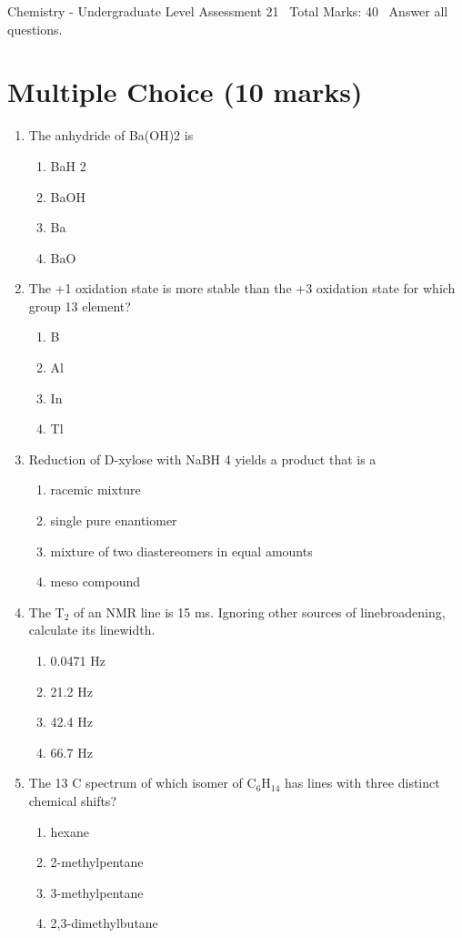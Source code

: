 \documentclass[12pt]{article}
\begin{document}
\begin{center}
Chemistry - Undergraduate Level Assessment 21 \
Total Marks: 40 \
Answer all questions.
\end{center}

\section*{Multiple Choice (10 marks)}
\begin{enumerate}[label=\arabic*.]
\item The anhydride of Ba(OH)2 is
\begin{enumerate}[label=(\alph*)]
    \item BaH 2
    \item BaOH
    \item Ba
    \item BaO
\end{enumerate}
\item The +1 oxidation state is more stable than the +3 oxidation state for which group 13 element?
\begin{enumerate}[label=(\alph*)]
    \item B
    \item Al
    \item In
    \item Tl
\end{enumerate}
\item Reduction of D-xylose with NaBH 4 yields a product that is a
\begin{enumerate}[label=(\alph*)]
    \item racemic mixture
    \item single pure enantiomer
    \item mixture of two diastereomers in equal amounts
    \item meso compound
\end{enumerate}
\item The T$_{2}$ of an NMR line is 15 ms. Ignoring other sources of linebroadening, calculate its linewidth.
\begin{enumerate}[label=(\alph*)]
    \item 0.0471 Hz
    \item 21.2 Hz
    \item 42.4 Hz
    \item 66.7 Hz
\end{enumerate}
\item The 13 C spectrum of which isomer of C$_{6}$H$_{14}$ has lines with three distinct chemical shifts?
\begin{enumerate}[label=(\alph*)]
    \item hexane
    \item 2-methylpentane
    \item 3-methylpentane
    \item 2,3-dimethylbutane
\end{enumerate}
\end{enumerate}
\end{document}
